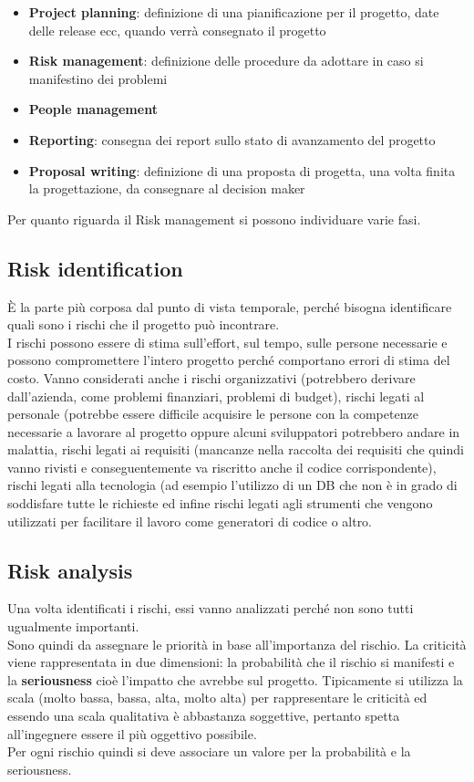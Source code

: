 \begin{itemize}[noitemsep]
    \item \textbf{Project planning}: definizione di una pianificazione per il progetto, date delle release ecc, quando verrà consegnato il progetto
    \item \textbf{Risk management}: definizione delle procedure da adottare in caso si manifestino dei problemi
    \item \textbf{People management}
    \item \textbf{Reporting}: consegna dei report sullo stato di avanzamento del progetto
    \item \textbf{Proposal writing}: definizione di una proposta di progetta, una volta finita la progettazione, da consegnare al decision maker
\end{itemize}
Per quanto riguarda il Risk management si possono individuare varie fasi.

\subsection{Risk identification}
È la parte più corposa dal punto di vista temporale, perché bisogna identificare quali sono i rischi che il progetto può incontrare.\\
I rischi possono essere di stima sull'effort, sul tempo, sulle persone necessarie e possono compromettere l'intero progetto perché comportano errori di stima del costo.
Vanno considerati anche i rischi organizzativi (potrebbero derivare dall'azienda, come problemi finanziari, problemi di budget), rischi legati al personale (potrebbe essere difficile acquisire le persone con la competenze necessarie a lavorare al progetto oppure alcuni sviluppatori potrebbero andare in malattia, rischi legati ai requisiti (mancanze nella raccolta dei requisiti che quindi vanno rivisti e conseguentemente va riscritto anche il codice corrispondente), rischi legati alla tecnologia (ad esempio l'utilizzo di un \acrshort{DB} che non è in grado di soddisfare tutte le richieste ed infine rischi legati agli strumenti che vengono utilizzati per facilitare il lavoro come generatori di codice o altro.

\subsection{Risk analysis}
Una volta identificati i rischi, essi vanno analizzati perché non sono tutti ugualmente importanti.\\
Sono quindi da assegnare le priorità in base all'importanza del rischio.
La criticità viene rappresentata in due dimensioni: la probabilità che il rischio si manifesti e la \textbf{seriousness} cioè l'impatto che avrebbe sul progetto.
Tipicamente si utilizza la scala (molto bassa, bassa, alta, molto alta) per rappresentare le criticità ed essendo una scala qualitativa è abbastanza soggettive, pertanto spetta all'ingegnere essere il più oggettivo possibile.\\
Per ogni rischio quindi si deve associare un valore per la probabilità e la seriousness.

